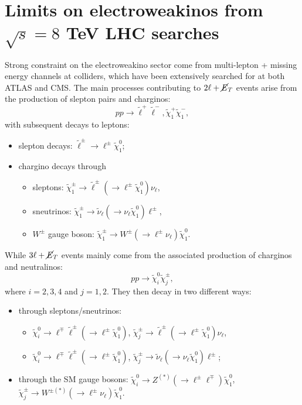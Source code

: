 \section{Limits on electroweakinos from $\sqrt{s}=8$ TeV LHC searches}

Strong constraint on the electroweakino sector come from multi-lepton + missing energy channels at colliders, which have been extensively searched for at both ATLAS and CMS. The main processes contributing to $2\ell+\cancel{E}_{T}$ events arise from the production of slepton pairs and charginos:
\begin{equation}
pp\rightarrow\widetilde{\ell}^{+}\widetilde{\ell}^{-},\widetilde{\chi}_{1}^{+}\widetilde{\chi}_{1}^{-},
\end{equation}
with subsequent decays to leptons:
\begin{itemize}
	\item slepton decays: $\widetilde{\ell}^{\pm}\rightarrow\ell^{\pm}\widetilde{\chi}_{1}^{0}$;
	\item chargino decays through 
    \begin{itemize}
    \item sleptons: $\widetilde{\chi}_{1}^{\pm}\rightarrow\widetilde{\ell}^{\pm}(\rightarrow\ell^{\pm}\widetilde{\chi}_{1}^{0})\nu_{\ell}$,
    \item sneutrinos: $\widetilde{\chi}_{1}^{\pm}\rightarrow\widetilde{\nu}_{\ell}(\rightarrow\nu_{\ell}\widetilde{\chi}_{1}^{0})\ell^{\pm}$,
    \item $W^{\pm}$ gauge boson: $\widetilde{\chi}_{1}^{\pm}\rightarrow W^\pm(\rightarrow\ell^{\pm}\nu_{\ell}) \widetilde{\chi}^0_1$.
    \end{itemize}
\end{itemize}
While $3\ell+\cancel{E}_{T}$ events mainly come from the associated production of charginos and neutralinos:
\begin{equation}
pp\rightarrow\widetilde{\chi}_{i}^{0}\widetilde{\chi}_{j}^{\pm},
\end{equation}
where $i=2,3,4$ and $j=1,2$. They then decay in two different ways:
\begin{itemize}
	\item through sleptons/sneutrinos:
    \begin{itemize}
    \item $\widetilde{\chi}_{i}^{0}\rightarrow\ell^{\mp}\widetilde{\ell}^{\pm}(\rightarrow\ell^{\pm}\widetilde{\chi}_{1}^{0})$, $\widetilde{\chi}_{j}^{\pm}\rightarrow\widetilde{\ell}^{\pm}(\rightarrow\ell^{\pm}\widetilde{\chi}_{1}^{0})\nu_{\ell}$,
    \item $\widetilde{\chi}_{i}^{0}\rightarrow\ell^{\mp}\widetilde{\ell}^{\pm}(\rightarrow\ell^{\pm}\widetilde{\chi}_{1}^{0})$, $\widetilde{\chi}_{j}^{\pm}\rightarrow\widetilde{\nu}_{\ell}(\rightarrow\nu_{\ell}\widetilde{\chi}_{1}^{0})\ell^{\pm}$;
    \end{itemize} 
	\item through the SM gauge bosons: $\widetilde{\chi}_{i}^{0}\rightarrow Z^{(*)}(\rightarrow \ell^\pm \ell^\mp)\widetilde{\chi}_{1}^{0}$, $\widetilde{\chi}_{j}^{\pm}\rightarrow W^{\pm(*)}(\rightarrow \ell^\pm \nu_\ell)\widetilde{\chi}_{1}^{0}$.
\end{itemize}
